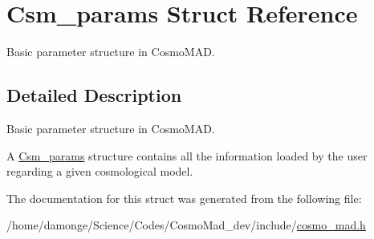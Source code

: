 \hypertarget{structCsm__params}{\section{Csm\-\_\-params Struct Reference}
\label{structCsm__params}
}


Basic parameter structure in Cosmo\-M\-A\-D.  




\subsection{Detailed Description}
Basic parameter structure in Cosmo\-M\-A\-D. 

A \hyperlink{structCsm__params}{Csm\-\_\-params} structure contains all the information loaded by the user regarding a given cosmological model. 

The documentation for this struct was generated from the following file\-:\begin{DoxyCompactItemize}
\item 
/home/damonge/\-Science/\-Codes/\-Cosmo\-Mad\-\_\-dev/include/\hyperlink{cosmo__mad_8h}{cosmo\-\_\-mad.\-h}\end{DoxyCompactItemize}
